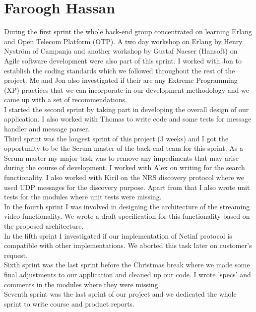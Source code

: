 \section{Faroogh Hassan}

During the first sprint the whole back-end group concentrated on learning Erlang and Open Telecom Platform (OTP). A two day workshop on Erlang by Henry Nyström of Campanja and another workshop by Gustaf Naeser (Hansoft) on Agile software development were also part of this sprint. I worked with Jon to establish the coding standards which we followed throughout the rest of the project. Me and Jon also investigated if their are any Extreme Programming (XP) practices that we can incorporate in our development methodology and we came up with a set of recommendations. \\

I started the second sprint by taking part in developing the overall design of our application. I also worked with Thomas to write code and some tests for message handler and message parser.\\

Third sprint was the longest sprint of this project (3 weeks) and I got the opportunity to be the Scrum master of the back-end team for this sprint. As a Scrum master my major task was to remove any impediments that may arise during the course of development. I worked with Alex on writing for the search functionality. I also worked with Kiril on the NRS discovery protocol where we used UDP messages for the discovery purpose. Apart from that I also wrote unit tests for the modules where unit tests were missing. \\

In the fourth sprint I was involved in designing the architecture of the streaming video functionality. We wrote a draft specification for this functionality based on the proposed architecture. \\

In the fifth sprint I investigated if our implementation of Netinf protocol is compatible with other implementations. We aborted this task later on customer's request. \\

Sixth sprint was the last sprint before the Christmas break where we made some final adjustments to our application and cleaned up our code. I wrote 'specs' and comments in the modules where they were missing. \\

Seventh sprint was the last sprint of our project and we dedicated the whole sprint to write course and product reports. \\
